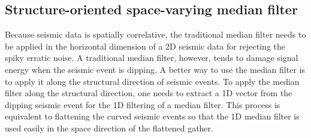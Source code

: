 \subsection{Structure-oriented space-varying median filter}
Because seismic data is spatially correlative, the traditional median filter needs to be applied in the horizontal dimension of a 2D seismic data for rejecting the spiky erratic noise.  A traditional median filter, however, tends to damage signal energy when the seismic event is dipping. A better way to use the median filter is to apply it along the structural direction of seismic events. To apply the median filter along the structural direction, one needs to extract a 1D vector from the dipping seismic event for the 1D filtering of a median filter. This process is equivalent to flattening the curved seismic events so that the 1D median filter is used easily in the space direction of the flattened gather. 


